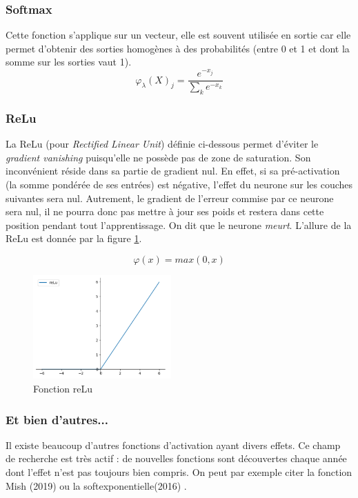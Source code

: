 \subsubsection{Softmax}
Cette fonction s'applique sur un vecteur, elle est souvent utilisée en sortie car elle permet d'obtenir des sorties homogènes à des probabilités (entre 0 et 1 et dont la somme sur les sorties vaut 1).
\begin{displaymath}
\varphi_\lambda (X)_j = \frac{e^{-x_j}}{\sum\limits_{k}  e^{-x_k}}
\end{displaymath}

\subsubsection{ReLu}
La ReLu (pour \textit{Rectified Linear Unit}) définie ci-dessous permet d'éviter le \textit{gradient vanishing} puisqu'elle ne possède pas de zone de saturation. Son inconvénient réside dans sa partie de gradient nul. En effet, si sa pré-activation (la somme pondérée de ses entrées) est négative, l'effet du neurone sur les couches suivantes sera nul. Autrement, le gradient de l'erreur commise par ce neurone sera nul, il ne pourra donc pas mettre à jour ses poids et restera dans cette position pendant tout l'apprentissage. On dit que le neurone \textit{meurt}. L'allure de la ReLu est donnée par la figure \ref{ReLu}.

\begin{displaymath}
\varphi (x) = max(0,x)
\end{displaymath}

\begin{figure}[!h]
\centering
\includegraphics[width=150pt]{"images/MLP/reLu2"}
\caption{Fonction reLu}
\label{ReLu}
\end{figure}

\subsubsection{Et bien d'autres...}
Il existe beaucoup d'autres fonctions d'activation ayant divers effets. Ce champ de recherche est très actif : de nouvelles fonctions sont découvertes chaque année dont l'effet n'est pas toujours bien compris. On peut par exemple citer la fonction Mish (2019) \cite{misra_mish_2019-1} ou la softexponentielle(2016)  \cite{godfrey_continuum_2016}.

